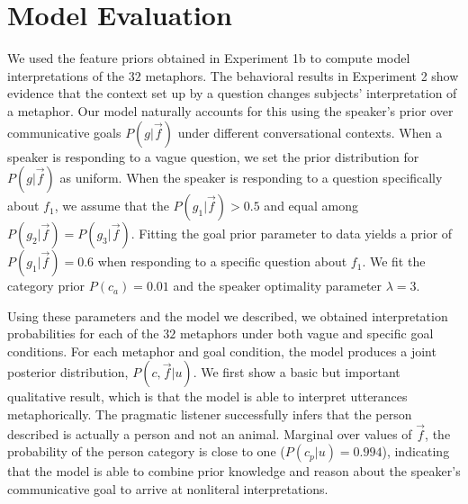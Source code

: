 \documentclass[10pt,letterpaper]{article}
\begin{document}
\section{Model Evaluation}
We used the feature priors obtained in Experiment 1b to compute model interpretations of the $32$ metaphors. The behavioral results in Experiment 2 show evidence that the context set up by a question changes subjects' interpretation of a metaphor. Our model naturally accounts for this using the speaker's prior over communicative goals $P(g | \vec f)$ under different conversational contexts. When a speaker is responding to a vague question, we set the prior distribution for $P(g | \vec f)$ as uniform. When the speaker is responding to a question specifically about $f_1$, we assume that the $P(g_1 | \vec f) > 0.5$ and equal among $P(g_2 | \vec f) = P(g_3 | \vec f)$. Fitting the goal prior parameter to data yields a prior of $P(g_1 | \vec f) = 0.6$ when responding to a specific question about $f_1$. We fit the category prior $P(c_a) = 0.01$ and the speaker optimality parameter $\lambda = 3$.

Using these parameters and the model we described, we obtained interpretation probabilities for each of the $32$ metaphors under both vague and specific goal conditions. For each metaphor and goal condition, the model produces a joint posterior distribution, $P(c, \vec f | u)$. We first show a basic but important qualitative result, which is that the model is able to interpret utterances metaphorically. The pragmatic listener successfully infers that the person described is actually a person and not an animal. Marginal over values of $\vec f$, the probability of the person category is close to one ($P(c_p | u) = 0.994$), indicating that the model is able to combine prior knowledge and reason about the speaker's communicative goal to arrive at nonliteral interpretations.

\end{document}
